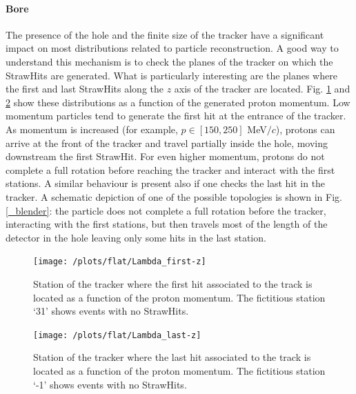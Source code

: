 \documentclass[12pt,a4paper,openright, oneside, titlepage]{book} %
\begin{document}
\paragraph{Bore} 
The presence of the hole and the finite size of the tracker have a significant impact on most distributions related to particle reconstruction.
A good way to understand this mechanism is to check the planes of the tracker on which the StrawHits are generated.
What is particularly interesting are the planes where the first and last StrawHits along the $z$ axis of the tracker are located. 
Fig. \ref{_Lambda_first-z} and \ref{_Lambda_last-z} show these distributions as a function of the generated proton momentum.
Low momentum particles tend to generate the first hit at the entrance of the tracker. 
As momentum is increased (for example, $p \in [150,250]$ MeV$/c$), protons can arrive at the front of the tracker and travel partially inside the hole, moving downstream the first StrawHit.
For even higher momentum, protons do not complete a full rotation before reaching the tracker and interact with the first stations.
A similar behaviour is present also if one checks the last hit in the tracker. 
A schematic depiction of one of the possible topologies is shown in Fig. \ref{_blender}: the particle does not complete a full rotation before the tracker, interacting with the first stations, but then travels most of the length of the detector in the hole leaving only some hits in the last station.

\begin{figure}[!htb]
\centering
\texttt{[image: /plots/flat/Lambda\_first-z]}
\caption[Station of first StrawHit]{Station of the tracker where the first hit associated to the track is located 
as a function of the proton momentum. The fictitious station `31' shows events with no StrawHits.}
\label{_Lambda_first-z}
\end{figure}

\begin{figure}[!htb]
\centering
\texttt{[image: /plots/flat/Lambda\_last-z]}
\caption[Station of last StrawHit]{Station of the tracker where the last hit associated to the track is located 
as a function of the proton momentum. The fictitious station `-1' shows events with no StrawHits.}
\label{_Lambda_last-z}
\end{figure}
\end{document}
